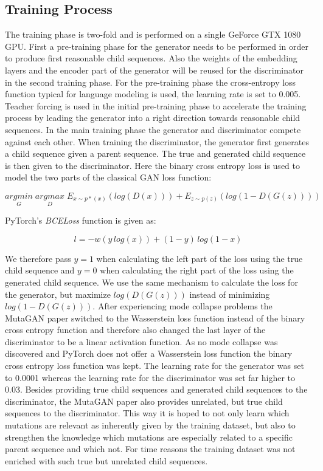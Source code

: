 \subsection{Training Process} \label{ch:approachD}

The training phase is two-fold and is performed on a single GeForce GTX 1080 \ac{GPU}. First a pre-training phase for the generator needs to be performed in order to produce first reasonable child sequences. Also the weights of the embedding layers and the encoder part of the generator will be reused for the discriminator in the second training phase. For the pre-training phase the cross-entropy loss function typical for language modeling is used, the learning rate is set to 0.005. Teacher forcing is used in the initial pre-training phase to accelerate the training process by leading the generator into a right direction towards reasonable child sequences. In the main training phase the generator and discriminator compete against each other. When training the discriminator, the generator first generates a child sequence given a parent sequence. The true and generated child sequence is then given to the discriminator. Here the binary cross entropy loss is used to model the two parts of the classical \ac{GAN} loss function: 

\begin{equation}
	\underset{G}{arg min} \; \underset{D}{arg max} \; E_{x \sim p*(x)}(log(D(x))) + E_{z \sim p(z)}(log(1-D(G(z))))
\end{equation}

PyTorch's \textit{BCELoss} function is given as:

\begin{equation}
	l = -w(y\,log(x)) + (1-y)\,log(1-x)
\end{equation}

We therefore pass $y=1$ when calculating the left part of the loss using the true child sequence and $y=0$ when calculating the right part of the loss using the generated child sequence. We use the same mechanism to calculate the loss for the generator, but maximize $log(D(G(z)))$ instead of minimizing $log(1-D(G(z)))$. After experiencing mode collapse problems the MutaGAN paper \cite{Berman2020} switched to the Wasserstein loss function instead of the binary cross entropy function and therefore also changed the last layer of the discriminator to be a linear activation function. As no mode collapse was discovered and PyTorch does not offer a Wasserstein loss function the binary cross entropy loss function was kept. The learning rate for the generator was set to 0.0001 whereas the learning rate for the discriminator was set far higher to 0.03. Besides providing true child sequences and generated child sequences to the discriminator, the MutaGAN paper \cite{Berman2020} also provides unrelated, but true child sequences to the discriminator. This way it is hoped to not only learn which mutations are relevant as inherently given by the training dataset, but also to strengthen the knowledge which mutations are especially related to a specific parent sequence and which not. For time reasons the training dataset was not enriched with such true but unrelated child sequences. 

